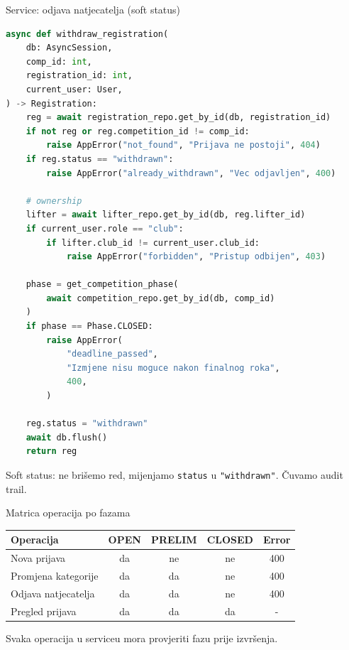\begin{frame}[fragile,shrink=5]{Service: odjava natjecatelja (soft status)}
\begin{lstlisting}[language=python]
async def withdraw_registration(
    db: AsyncSession,
    comp_id: int,
    registration_id: int,
    current_user: User,
) -> Registration:
    reg = await registration_repo.get_by_id(db, registration_id)
    if not reg or reg.competition_id != comp_id:
        raise AppError("not_found", "Prijava ne postoji", 404)
    if reg.status == "withdrawn":
        raise AppError("already_withdrawn", "Vec odjavljen", 400)

    # ownership
    lifter = await lifter_repo.get_by_id(db, reg.lifter_id)
    if current_user.role == "club":
        if lifter.club_id != current_user.club_id:
            raise AppError("forbidden", "Pristup odbijen", 403)

    phase = get_competition_phase(
        await competition_repo.get_by_id(db, comp_id)
    )
    if phase == Phase.CLOSED:
        raise AppError(
            "deadline_passed",
            "Izmjene nisu moguce nakon finalnog roka",
            400,
        )

    reg.status = "withdrawn"
    await db.flush()
    return reg
\end{lstlisting}

\vspace{0.4em}
Soft status: ne brišemo red, mijenjamo \texttt{status} u \texttt{"withdrawn"}. Čuvamo audit trail.
\end{frame}

\begin{frame}{Matrica operacija po fazama}
\begin{tabular}{@{}lcccc@{}}
  \toprule
  \textbf{Operacija} & \textbf{OPEN} & \textbf{PRELIM} & \textbf{CLOSED} & \textbf{Error} \\
  \midrule
  Nova prijava         & da & ne & ne & 400 \\
  Promjena kategorije  & da & da & ne & 400 \\
  Odjava natjecatelja  & da & da & ne & 400 \\
  Pregled prijava      & da & da & da & - \\
  \bottomrule
\end{tabular}

\vspace{0.6em}
Svaka operacija u serviceu mora provjeriti fazu prije izvršenja.
\end{frame}

